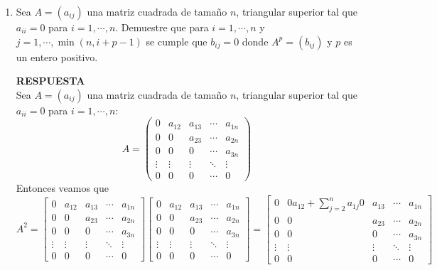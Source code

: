\documentclass[11pt,letterpaper]{article}
\newcommand{\res}{\textbf{RESPUESTA}\\}
\begin{document}
\begin{enumerate}
\item Sea $A=(a_{ij})$ una matriz cuadrada de tamaño $n$, triangular superior tal que $a_{ii}=0$ para $i=1, \cdots , n.$ Demuestre que para $i=1, \cdots , n$ y $j=1, \cdots , \min (n,i+p-1)$ se cumple que $b_{ij}=0$ donde $A^p=(b_{ij})$ y $p$ es un entero positivo. 

\res
Sea $A=(a_{ij})$ una matriz cuadrada de tamaño $n$, triangular superior tal que $a_{ii}=0$ para $i=1, \cdots , n$:
\begin{equation*}
A=\left( \begin{array}{ccccc}
0& a_{12} & a_{13} & \cdots & a_{1n}\\
0 & 0 & a_{23} & \cdots & a_{2n}\\
0 & 0 & 0 & \cdots & a_{3n}\\
\vdots & \vdots & \vdots & \ddots & \vdots\\
0 & 0 & 0 & \cdots & 0
\end{array}\right)
\end{equation*}
Entonces veamos que 
\begin{equation*}
A^2=\left[ \begin{array}{ccccc}
0& a_{12} & a_{13} & \cdots & a_{1n}\\
0 & 0 & a_{23} & \cdots & a_{2n}\\
0 & 0 & 0 & \cdots & a_{3n}\\
\vdots & \vdots & \vdots & \ddots & \vdots\\
0 & 0 & 0 & \cdots & 0
\end{array}\right]
\left[ \begin{array}{ccccc}
0& a_{12} & a_{13} & \cdots & a_{1n}\\
0 & 0 & a_{23} & \cdots & a_{2n}\\
0 & 0 & 0 & \cdots & a_{3n}\\
\vdots & \vdots & \vdots & \ddots & \vdots\\
0 & 0 & 0 & \cdots & 0
\end{array}\right]= 
\left[ \begin{array}{ccccc}
0 & 0a_{12}+\sum_{j=2}^na_{1j}0 & a_{13} & \cdots & a_{1n}\\
0 & 0 & a_{23} & \cdots & a_{2n}\\
0 & 0 & 0 & \cdots & a_{3n}\\
\vdots & \vdots & \vdots & \ddots & \vdots\\
0 & 0 & 0 & \cdots & 0
\end{array}\right]
\end{equation*}

\end{enumerate}
\end{document}
